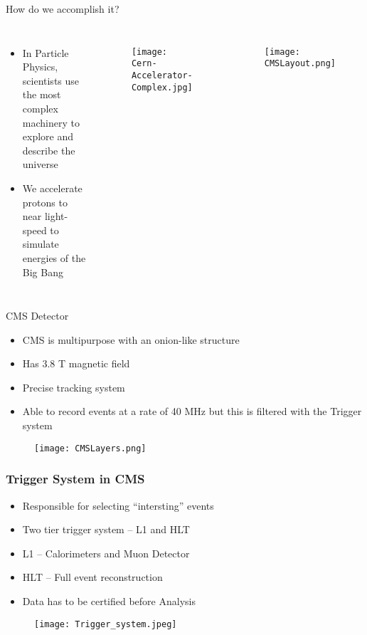 \documentclass[aspectratio=1610]{beamer}
\begin{document}
\begin{frame}{How do we accomplish it?}
	\begin{columns}
		\begin{itemize}
			\item In Particle Physics, scientists use the most complex machinery to explore and describe the universe
			\item We accelerate protons to near light-speed to simulate energies of the Big Bang
		\end{itemize}
		\begin{figure}
			\centering
			\texttt{[image: Cern-Accelerator-Complex.jpg]}
		\end{figure}
		\begin{figure}
			\centering
			\texttt{[image: CMSLayout.png]}
		\end{figure}
	\end{columns}
\end{frame}

\begin{frame}{CMS Detector}
	\begin{itemize}
		\item CMS is multipurpose with an onion-like structure
		\item Has 3.8 T magnetic field
		\item Precise tracking system
		\item Able to record events at a rate of 40 MHz but this is filtered with the Trigger system
	\end{itemize}
	\begin{figure}
		\centering
		\texttt{[image: CMSLayers.png]}
	\end{figure}
\end{frame}

\begin{frame}
	\frametitle{Trigger System in CMS}
	\begin{itemize}
		\item Responsible for selecting ``intersting'' events
		\item Two tier trigger system -- L1 and HLT
		\item L1 -- Calorimeters and Muon Detector
		\item HLT -- Full event reconstruction
		\item Data has to be certified before Analysis
	\end{itemize}
	\vfill
	\begin{figure}
		\texttt{[image: Trigger\_system.jpeg]}
	\end{figure}

\end{frame}
\end{document}

